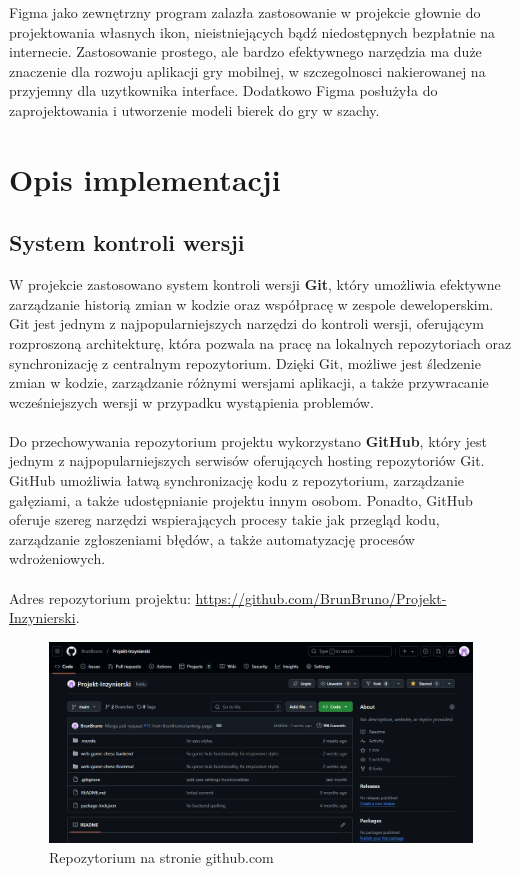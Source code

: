 \documentclass[12pt,a4paper]{article}
\begin{document}
Figma jako zewnętrzny program zalazła zastosowanie w projekcie głownie do projektowania własnych ikon, nieistniejących bądź niedostępnych bezpłatnie na internecie. Zastosowanie prostego, ale bardzo efektywnego narzędzia ma duże znaczenie dla rozwoju aplikacji gry mobilnej, w szczegolnosci nakierowanej na przyjemny dla uzytkownika interface. Dodatkowo Figma posłużyła do zaprojektowania i utworzenie modeli bierek do gry w szachy.  

\newpage

\section{Opis implementacji}
\subsection{System kontroli wersji}

W projekcie zastosowano system kontroli wersji \textbf{Git}, który umożliwia efektywne zarządzanie historią zmian w kodzie oraz współpracę w zespole deweloperskim. Git jest jednym z najpopularniejszych narzędzi do kontroli wersji, oferującym rozproszoną architekturę, która pozwala na pracę na lokalnych repozytoriach oraz synchronizację z centralnym repozytorium. Dzięki Git, możliwe jest śledzenie zmian w kodzie, zarządzanie różnymi wersjami aplikacji, a także przywracanie wcześniejszych wersji w przypadku wystąpienia problemów.
\\\\
Do przechowywania repozytorium projektu wykorzystano  \textbf{GitHub}, który jest jednym z najpopularniejszych serwisów oferujących hosting repozytoriów Git. GitHub umożliwia łatwą synchronizację kodu z repozytorium, zarządzanie gałęziami, a także udostępnianie projektu innym osobom. Ponadto, GitHub oferuje szereg narzędzi wspierających procesy takie jak przegląd kodu, zarządzanie zgłoszeniami błędów, a także automatyzację procesów wdrożeniowych.
\\\\
Adres repozytorium projektu: \href{https://github.com/BrunBruno/Projekt-Inzynierski}{https://github.com/BrunBruno/Projekt-Inzynierski}.

\vspace{1cm}
\begin{figure}[h!]
    \centering
    \includegraphics[width=1\textwidth]{images/gh_repo.png}
    \caption{Repozytorium na stronie github.com}
\end{figure}
\vspace{1cm}
\end{document}
